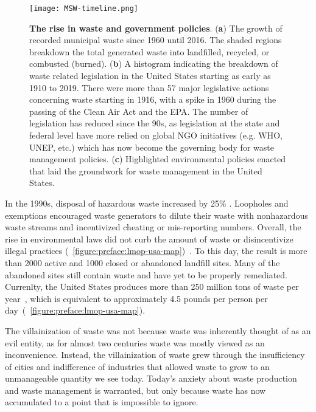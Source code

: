 \documentclass[../main/main]{subfiles}
\begin{document}
\begin{figure}[H]
	\centering
	\texttt{[image: MSW-timeline.png]}
	\caption[The rise in waste and government policies]
	{
		\textbf{The rise in waste and government policies}\protect\footnotemark.
		(\textbf{a}) The growth of recorded municipal waste since 1960 until 2016. The shaded regions breakdown the total generated waste into landfilled, recycled, or combusted (burned).
		(\textbf{b}) A histogram indicating the breakdown of waste related legislation in the United States starting as early as 1910 to 2019. There were more than 57 major legislative actions concerning waste starting in 1916, with a spike in 1960 during the passing of the Clean Air Act and the EPA. The number of legislation has reduced since the 90s, as legislation at the state and federal level have more relied on global NGO initiatives (e.g. WHO, UNEP, etc.) which has now become the governing body for waste management policies.
		(\textbf{c}) Highlighted environmental policies enacted that laid the groundwork for waste management in the United States.
  }
  \label{figure:preface:us-timeline}
\end{figure}

\noindent  In the 1990s, disposal of hazardous waste increased by 25\% \cite{usepa2015,usepa2017b,andrews2018}.
Loopholes and exemptions encouraged waste generators to dilute their waste with nonhazardous waste streams and incentivized cheating or mis-reporting numbers. Overall, the rise in environmental laws did not curb the amount of waste or disincentivize illegal practices (\FIGURE~\ref{figure:preface:lmop-usa-map})~\cite{elliott2013,colten2010}. To this day, the result is more than 2000 active and 1000 closed or abandoned landfill sites. Many of the abandoned sites still contain waste and have yet to be properly remediated. Currenlty, the United States produces more than 250 million tons of waste per year~\cite{usepa2017b}, which is equivalent to approximately 4.5 pounds per person per day~(\FIGURE~\ref{figure:preface:lmop-usa-map}).

The villainization of waste was not because waste was inherently thought of as an evil entity, as for almost two centuries waste was mostly viewed as an inconvenience. Instead, the villainization of waste grew through the insufficiency of cities and indifference of industries that allowed waste to grow to an unmanageable quantity we see today. Today's anxiety about waste production and waste management is warranted, but only because waste has now accumulated to a point that is impossible to ignore.
\end{document}
